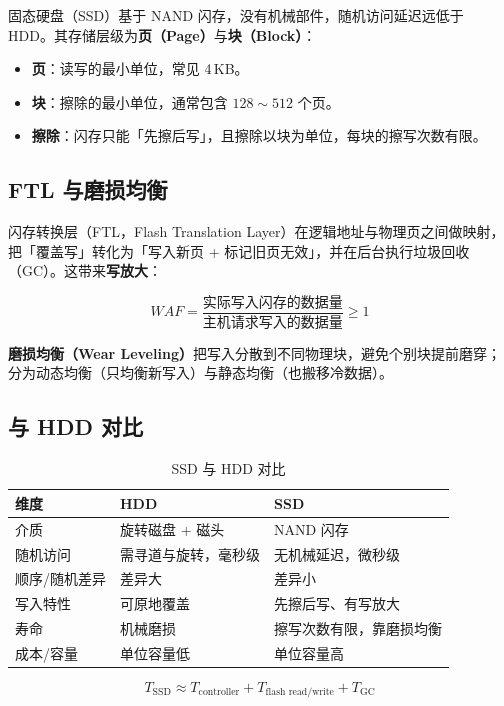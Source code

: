 固态硬盘（SSD）基于 NAND 闪存，没有机械部件，随机访问延迟远低于 HDD。其存储层级为\textbf{页（Page）}与\textbf{块（Block）}：

\begin{itemize}
    \item \textbf{页}：读写的最小单位，常见 4\,KB。
    \item \textbf{块}：擦除的最小单位，通常包含 $128\sim512$ 个页。
    \item \textbf{擦除}：闪存只能「先擦后写」，且擦除以块为单位，每块的擦写次数有限。
\end{itemize}

\subsection{FTL 与磨损均衡}

闪存转换层（FTL，Flash Translation Layer）在逻辑地址与物理页之间做映射，把「覆盖写」转化为「写入新页 + 标记旧页无效」，并在后台执行垃圾回收（GC）。这带来\textbf{写放大}：

\begin{equation}
WAF = \frac{\text{实际写入闪存的数据量}}{\text{主机请求写入的数据量}} \ge 1
\end{equation}

\textbf{磨损均衡（Wear Leveling）}把写入分散到不同物理块，避免个别块提前磨穿；分为动态均衡（只均衡新写入）与静态均衡（也搬移冷数据）。

\subsection{与 HDD 对比}

\begin{table}[H]
\centering
\caption{SSD 与 HDD 对比}
\begin{tabulary}{\textwidth}{LLL}
\toprule
维度 & HDD & SSD \\
\midrule
介质 & 旋转磁盘 + 磁头 & NAND 闪存 \\
随机访问 & 需寻道与旋转，毫秒级 & 无机械延迟，微秒级 \\
顺序/随机差异 & 差异大 & 差异小 \\
写入特性 & 可原地覆盖 & 先擦后写、有写放大 \\
寿命 & 机械磨损 & 擦写次数有限，靠磨损均衡 \\
成本/容量 & 单位容量低 & 单位容量高 \\
\bottomrule
\end{tabulary}
\end{table}

\begin{equation}
T_{\text{SSD}} \approx T_{\text{controller}} + T_{\text{flash read/write}} + T_{\text{GC}}
\end{equation}
